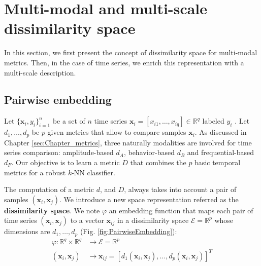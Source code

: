 \section{Multi-modal and multi-scale dissimilarity space} 
\label{sec:Pairwise_embedding}
In this section, we first present the concept of dissimilarity space for multi-modal metrics. Then, in the case of time series, we enrich this representation with a multi-scale description. 

\subsection{Pairwise embedding}
Let $\{\textbf{x}_{i}, y_{i}\}_{i=1}^n$ be a set of $n$ time series $\textbf{x}_i = [x_{i1}, \ldots, x_{iq}] \in \mathbb{R}^q$ labeled $y_{i}$ . Let  $d_1, \ldots , d_p$ be $p$ given metrics that allow to compare samples $\textbf{x}_{i}$. As discussed in Chapter \ref{sec:Chapter_metrics}, three naturally modalities are involved for time series comparison: amplitude-based $d_A$, behavior-based $d_B$ and frequential-based $d_F$. Our objective is to learn a metric $D$ that combines the $p$ basic temporal metrics for a robust $k$-NN classifier.

The computation of a metric $d$, and $D$, always takes into account a pair of samples $(\textbf{x}_i,\textbf{x}_j)$. We introduce a new space representation referred as the \textbf{dissimilarity space}. We note $\varphi$ an embedding function that maps each pair of time
series $(\textbf{x}_i, \textbf{x}_j)$ to a vector $\textbf{x}_{ij}$ in a dissimilarity space $\mathcal{E} = \mathbb{R}^p$ whose dimensions are $d_1, \ldots, d_p$ (Fig. \ref{fig:PairwiseEmbedding}):
\begin{equation}
\begin{aligned}
\varphi : \mathbb{R}^q \times \mathbb{R}^q & \rightarrow \mathcal{E} = \mathbb{R}^p \\
(\textbf{x}_i, \textbf{x}_j) & \rightarrow \textbf{x}_{ij} = [d_1(\textbf{x}_i, \textbf{x}_j), \ldots, d_p(\textbf{x}_i, \textbf{x}_j)]^T
\end{aligned}
\label{eq:projection}
\end{equation}

